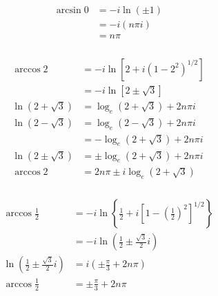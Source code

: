 \documentclass{article}
\begin{document}
\setcounter{subsubsection}{2}
\subsubsection{}

\begin{align*}
  \arcsin 0 & = -i \ln (\pm 1) \\
            & = -i (n \pi i)   \\
            & = n \pi
\end{align*}

\setcounter{subsubsection}{4}
\subsubsection{}

\begin{align*}
  \arccos 2            & = -i \ln [2 + i (1 - 2^2)^{1 / 2}]      \\
                       & = -i \ln [2 \pm \sqrt{3}]               \\
  \ln (2 + \sqrt{3})   & = \log_e (2 + \sqrt{3}) + 2 n \pi i     \\
  \ln (2 - \sqrt{3})   & = \log_e (2 - \sqrt{3}) + 2 n \pi i     \\
                       & = -\log_e (2 + \sqrt{3}) + 2 n \pi i    \\
  \ln (2 \pm \sqrt{3}) & = \pm \log_e (2 + \sqrt{3}) + 2 n \pi i \\
  \arccos 2            & = 2 n \pi \pm i \log_e (2 + \sqrt{3})
\end{align*}

\setcounter{subsubsection}{6}
\subsubsection{}

\begin{align*}
  \arccos \frac{1}{2}                                     & = -i \ln \left\{ \frac{1}{2} + i \left[ 1 - \left( \frac{1}{2} \right)^2 \right]^{1 / 2} \right\} \\
                                                          & = -i \ln \left( \frac{1}{2} \pm \frac{\sqrt{3}}{2} i \right)                                      \\
  \ln \left( \frac{1}{2} \pm \frac{\sqrt{3}}{2} i \right) & = i \left( \pm \frac{\pi}{3} + 2 n \pi \right)                                                    \\
  \arccos \frac{1}{2}                                     & = \pm \frac{\pi}{3} + 2 n \pi
\end{align*}
\end{document}
